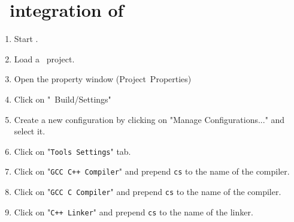 \section{\Eclipse\ integration of \TestCocoon}

\begin{enumerate}
\item Start \Eclipse.
\item Load a \CorCPlusPlus\ project.
\item Open the property window (Project\arrow\ Properties)
\item Click on "\CorCPlusPlus\ Build/Settings"
\item Create a new configuration by clicking on "Manage Configurations..." and select it.
\item Click on "\texttt{Tools Settings}" tab.
\item Click on "\texttt{GCC C++ Compiler}" and prepend \texttt{cs} to the name of the compiler.
\item Click on "\texttt{GCC C Compiler}" and prepend \texttt{cs} to the name of the compiler.
\item Click on "\texttt{C++ Linker}" and prepend \texttt{cs} to the name of the linker.
\end{enumerate}


